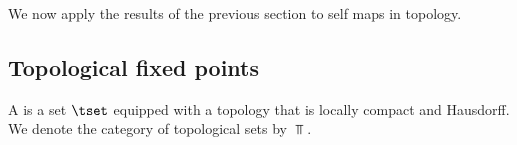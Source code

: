 
We now apply the results of the previous section to self maps in 
topology.

\subsection{Topological fixed points}

\begin{defn}
    A  is a set $\tset$ equipped
    with a topology that is locally compact and Hausdorff. We denote
    the category of topological sets by $\Top$. 
\end{defn}

